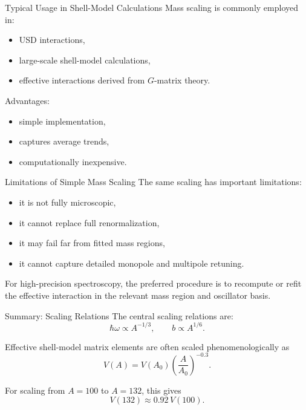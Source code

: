\documentclass[10pt]{beamer}
\begin{document}
\begin{frame}[t]{Typical Usage in Shell-Model Calculations}
\small
Mass scaling is commonly employed in:
\begin{itemize}
    \item USD interactions,
    \item large-scale shell-model calculations,
    \item effective interactions derived from \(G\)-matrix theory.
\end{itemize}

\medskip

Advantages:
\begin{itemize}
    \item simple implementation,
    \item captures average trends,
    \item computationally inexpensive.
\end{itemize}
\end{frame}

\begin{frame}[t]{Limitations of Simple Mass Scaling}
\small
The same scaling has important limitations:
\begin{itemize}
    \item it is not fully microscopic,
    \item it cannot replace full renormalization,
    \item it may fail far from fitted mass regions,
    \item it cannot capture detailed monopole and multipole retuning.
\end{itemize}

\medskip

For high-precision spectroscopy, the preferred procedure is to recompute or
refit the effective interaction in the relevant mass region and oscillator
basis.
\end{frame}

\begin{frame}[t]{Summary: Scaling Relations}
\small
The central scaling relations are:
\[
\hbar\omega \propto A^{-1/3},
\qquad
b\propto A^{1/6} .
\]

Effective shell-model matrix elements are often scaled phenomenologically as
\[
V(A)=V(A_0)\left(\frac{A}{A_0}\right)^{-0.3} .
\]

For scaling from \(A=100\) to \(A=132\), this gives
\[
V(132)\approx 0.92\,V(100) .
\]
\end{frame}
\end{document}
